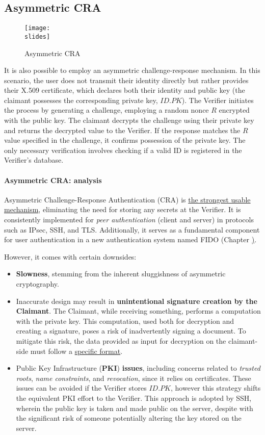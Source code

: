 \subsection{Asymmetric CRA}
\begin{figure}[h]
  \centering
  \texttt{[image: \\slides]}
  \caption{Asymmetric CRA}
\end{figure}
It is also possible to employ an asymmetric challenge-response mechanism. In this scenario, the user does not transmit their identity directly but rather provides their X.509 certificate, which declares both their identity and public key (the claimant possesses the corresponding private key, $ID.PK$). The Verifier initiates the process by generating a challenge, employing a random nonce \(R\) encrypted with the public key. The claimant decrypts the challenge using their private key and returns the decrypted value to the Verifier. If the response matches the \(R\) value specified in the challenge, it confirms possession of the private key. The only necessary verification involves checking if a valid ID is registered in the Verifier's database.

\paragraph*{Asymmetric CRA: analysis}
Asymmetric Challenge-Response Authentication (CRA) is \ul{the strongest usable mechanism}, eliminating the need for storing any secrets at the Verifier. It is consistently implemented for \textit{peer authentication} (client and server) in protocols such as IPsec, SSH, and TLS. Additionally, it serves as a fundamental component for user authentication in a new authentication system named FIDO (Chapter \href{chap:fido}).

However, it comes with certain downsides:
\begin{itemize}
  \item \textbf{Slowness}, stemming from the inherent sluggishness of asymmetric cryptography.
  \item Inaccurate design may result in \textbf{unintentional signature creation by the Claimant}.
        The Claimant, while receiving something, performs a computation with the private key.
        This computation, used both for decryption and creating a signature, poses a risk of inadvertently signing a document. To mitigate this risk, the data provided as input for decryption on the claimant-side must follow a \underline{specific format}.
  \item Public Key Infrastructure (\textbf{PKI}) \textbf{issues}, including concerns related to \textit{trusted roots}, \textit{name constraints}, and \textit{revocation}, since it relies on certificates. These issues can be avoided if the Verifier stores \(ID.PK\), however this strategy shifts the equivalent PKI effort to the Verifier.
        This approach is adopted by SSH, wherein the public key is taken and made public on the server, despite with the significant risk of someone potentially altering the key stored on the server.
\end{itemize}


